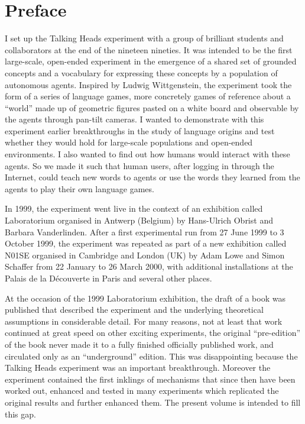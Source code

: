 \chapter*{Preface}

I set up the Talking Heads experiment with a group of brilliant students and collaborators at the end of the nineteen nineties. It was intended to be the first large-scale, open-ended experiment in the emergence of a shared set of grounded concepts and a vocabulary for expressing these concepts by a population of autonomous agents. Inspired by Ludwig Wittgenstein, the experiment took the form of a series of language games, more concretely games of reference about a ``world'' made up of geometric figures pasted on a white board and observable by the agents through pan-tilt cameras. 
I  wanted to demonstrate with this experiment earlier breakthroughs in the study of language origins and 
test whether they would hold for large-scale populations and open-ended environments. I also wanted to find 
out how humans would interact with these agents. So we made it such that human users, after logging in through the 
Internet, could teach new words to agents or use the words they learned from the agents to play their own language games. 

In 1999, the experiment went live in the context of an exhibition called Laboratorium organised in 
Antwerp (Belgium) by Hans-Ulrich Obrist and Barbara Vanderlinden. After a first experimental run from 27 June 1999 to 
3 October 1999, the experiment was repeated as part of a new exhibition called N01SE organised in Cambridge and 
London (UK) by Adam Lowe and Simon Schaffer from 22 January to 26 March 2000, with additional installations at 
the Palais de la D\'{e}couverte in Paris and several other places. 

At the occasion of the 1999 Laboratorium exhibition, the draft of a book was published 
that described the experiment and the underlying theoretical assumptions in considerable detail. 
For many reasons, not at least 
that work continued at great speed on other exciting experiments, the original ``pre-edition'' of the
book never made it to a fully finished officially 
published work, and circulated only as an ``underground'' edition. 
This was disappointing because the Talking Heads experiment was an important breakthrough. 
Moreover the experiment contained the first inklings of mechanisms that since 
then have been worked out, enhanced and tested in many experiments which replicated the original results and further
enhanced them. The present volume is intended to fill this gap. 

